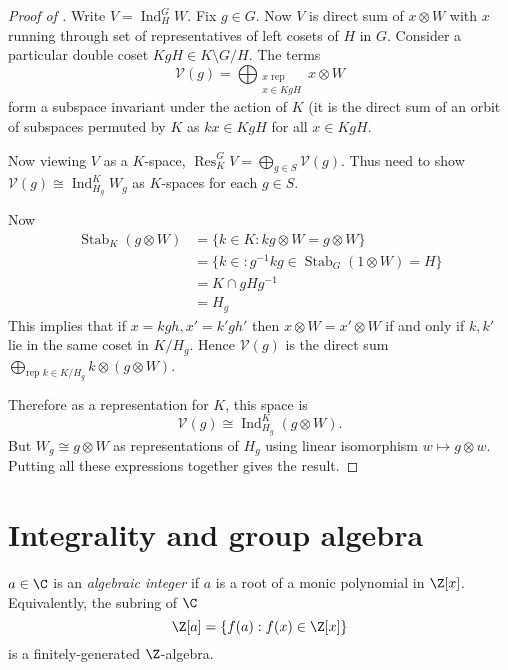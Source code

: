 \documentclass[a4paper]{article}
\DeclareMathOperator{\Res}{Res} %
\DeclareMathOperator{\Ind}{Ind} %
\theoremstyle{definition}
\begin{document}
\begin{proof}[Proof of ]
  Write \(V = \Ind_H^G W\). Fix \(g \in G\). Now \(V\) is direct sum of \(x \otimes W\) with \(x\) running through set of representatives of left cosets of \(H\) in \(G\). Consider a particular double coset \(KgH \in K \setminus G/H\). The terms
  \[
    \mathcal V(g) = \bigoplus_{\substack{x \text{ rep} \\ x \in KgH}} x \otimes W
  \]
  form a subspace invariant under the action of \(K\) (it is the direct sum of an orbit of subspaces permuted by \(K\) as \(kx \in KgH\) for all \(x \in KgH\).

  Now viewing \(V\) as a \(K\)-space, \(\Res_K^G V = \bigoplus_{g \in S} \mathcal V(g)\). Thus need to show \(\mathcal V(g) \cong \Ind_{H_g}^K W_g\) as \(K\)-spaces for each \(g \in S\).

  Now
  \begin{align*}
    \operatorname{Stab}_K (g \otimes W)
    &= \{k \in K: kg \otimes W = g \otimes W\} \\
    &= \{k \in : g^{-1}kg \in \operatorname{Stab}_G(1 \otimes W) = H\} \\
    &= K \cap gHg^{-1} \\
    &= H_g
  \end{align*}
  This implies that if \(x = kgh, x' = k'gh'\) then \(x \otimes W = x' \otimes W\) if and only if \(k, k'\) lie in the same coset in \(K/H_g\). Hence \(\mathcal V(g)\) is the direct sum \(\bigoplus_{\text{rep } k \in K/H_g} k \otimes (g \otimes W)\).

  Therefore as a representation for \(K\), this space is
  \[
    \mathcal V(g) \cong \Ind_{H_g}^K (g \otimes W).
  \]
  But \(W_g \cong g \otimes W\) as representations of \(H_g\) using linear isomorphism \(w \mapsto g \otimes w\). Putting all these expressions together gives the result.
\end{proof}

\section{Integrality and group algebra}

\begin{definition}
  \(a \in \C\) is an \emph{algebraic integer} if \(a\) is a root of a monic polynomial in \(\Z[x]\). Equivalently, the subring of \(\C\)
  \[
    \Z[a] = \{f(a): f(x) \in \Z[x]\}
  \]
  is a finitely-generated \(\Z\)-algebra.
\end{definition}
\end{document}
